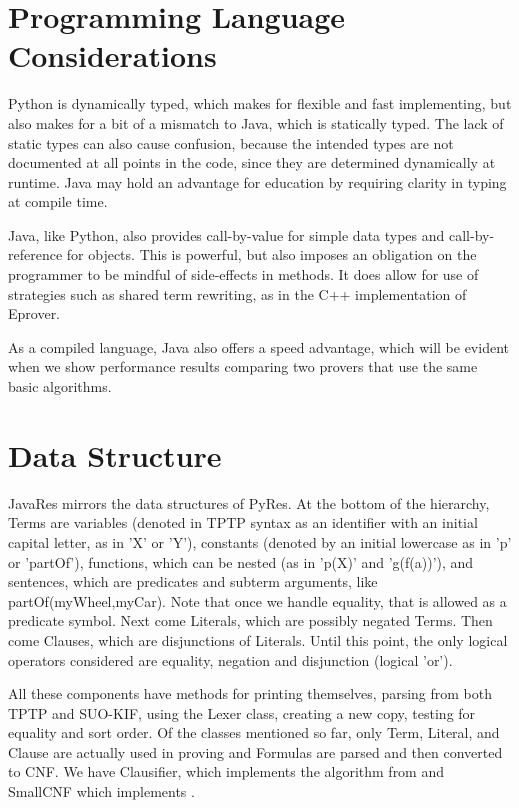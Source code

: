\documentclass{llncs}
\begin{document}
\section{Programming Language Considerations}

Python is dynamically typed, which makes for flexible and fast implementing, but also makes
for a bit of a mismatch to Java, which is statically typed.  The lack of static
types can also cause confusion, because the intended types are not
documented at all points in the code, since they are determined dynamically at
runtime.  Java may hold an advantage for education by requiring clarity in typing
at compile time.

Java, like Python, also provides call-by-value for simple data types and call-by-reference for
objects.  This is powerful, but also imposes an obligation on the programmer to
be mindful of side-effects in methods.  It does allow for use of strategies such as
shared term rewriting, as in the C++ implementation of Eprover.

As a compiled language, Java also offers a speed advantage, which will be evident
when we show performance results comparing two provers that use the same basic algorithms.

\section{Data Structure}

JavaRes mirrors the data structures of PyRes.  At the bottom of the hierarchy, Terms
are variables (denoted in TPTP syntax as an identifier with an initial capital letter,
as in 'X' or 'Y'), constants (denoted by an initial lowercase as in 'p' or 'partOf'),
functions, which can be nested (as in 'p(X)' and 'g(f(a))'), and sentences, which are predicates and
subterm arguments, like partOf(myWheel,myCar).  Note that once we handle equality, that
is allowed as a predicate symbol.  Next come Literals,
which are possibly negated Terms.  Then come Clauses, which are disjunctions of Literals.
Until this point, the only logical operators considered are equality, negation and disjunction (logical 'or').

All these components have methods for printing themselves, parsing from both TPTP and
SUO-KIF, using the Lexer class, creating a new copy, testing for equality and sort order. Of the
classes mentioned so far, only Term, Literal, and Clause are actually used in proving and Formulas
are parsed and then converted to CNF.  We have Clausifier, which implements the algorithm from
\cite{RN:AI-95} and SmallCNF which implements \cite{NW:SmallCNF-2001}.
\end{document}
